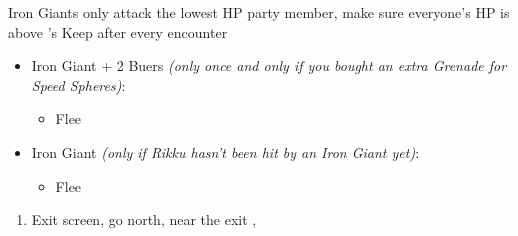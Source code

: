 \begin{encounters}
    Iron Giants only attack the lowest HP party member, make sure everyone's HP is above \rikku's\newline
    Keep \formation{\tidus}{\wakka}{\auron} after every encounter
    \begin{itemize}
        \item Iron Giant + 2 Buers \textit{(only once and only if you bought an extra Grenade for Speed Spheres)}:
        \begin{itemize}
            \switch{\tidus}{\rikku}
            \rikkuf Use Grenade
            \wakkaf Defend
            \auronf Defend
            \enemyf Attacks \rikku
            \switch{\wakka}{\tidus}
            \item Flee
        \end{itemize}
        \item Iron Giant \textit{(only if Rikku hasn't been hit by an Iron Giant yet)}:
        \begin{itemize}
            \tidusf Defend
            \switch{\wakka}{\rikku}
            \rikkuf Attack self
            \auronf Defend
            \enemyf Attacks \rikku
            \item Flee
        \end{itemize}
    \end{itemize}
\end{encounters}
\begin{enumerate}[resume]
    \item Exit screen, go north, near the exit \sd, \cs[3:10]
\end{enumerate}
